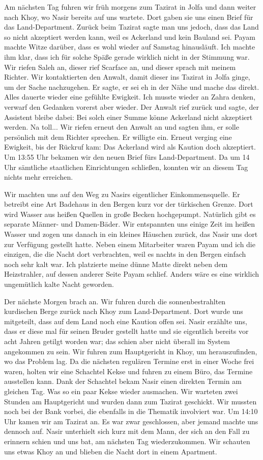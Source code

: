 Am nächsten Tag fuhren wir früh morgens zum Tazirat in Jolfa und dann weiter nach Khoy, wo Nasir bereits auf uns wartete. Dort gaben sie uns einen Brief für das Land-Department. Zurück beim Tazirat sagte man uns jedoch, dass das Land so nicht akzeptiert werden kann, weil es Ackerland und kein Bauland sei. Payam machte Witze darüber, dass es wohl wieder auf Samstag hinausläuft. Ich machte ihm klar, dass ich für solche Späße gerade wirklich nicht in der Stimmung war. Wir riefen Saleh an, dieser rief Scarface an, und dieser sprach mit meinem Richter. Wir kontaktierten den Anwalt, damit dieser ins Tazirat in Jolfa ginge, um der Sache nachzugehen. Er sagte, er sei eh in der Nähe und mache das direkt. Alles dauerte wieder eine gefühlte Ewigkeit. Ich musste wieder an Zahra denken, verwarf den Gedanken vorerst aber wieder. Der Anwalt rief zurück und sagte, der Assistent bleibe dabei: Bei solch einer Summe könne Ackerland nicht akzeptiert werden. Na toll... Wir riefen erneut den Anwalt an und sagten ihm, er solle persönlich mit dem Richter sprechen. Er willigte ein. Erneut verging eine Ewigkeit, bis der Rückruf kam: Das Ackerland wird als Kaution doch akzeptiert. Um 13:55 Uhr bekamen wir den neuen Brief fürs Land-Department. Da um 14 Uhr sämtliche staatlichen Einrichtungen schließen, konnten wir an diesem Tag nichts mehr erreichen.

Wir machten uns auf den Weg zu Nasirs eigentlicher Einkommensquelle. Er betreibt eine Art Badehaus in den Bergen kurz vor der türkischen Grenze. Dort wird Wasser aus heißen Quellen in große Becken hochgepumpt. Natürlich gibt es separate Männer- und Damen-Bäder. Wir entspannten uns einige Zeit im heißen Wasser und zogen uns danach in ein kleines Häuschen zurück, das Nasir uns dort zur Verfügung gestellt hatte. Neben einem Mitarbeiter waren Payam und ich die einzigen, die die Nacht dort verbrachten, weil es nachts in den Bergen einfach noch sehr kalt war. Ich platzierte meine dünne Matte direkt neben dem Heizstrahler, auf dessen anderer Seite Payam schlief. Anders wäre es eine wirklich ungemütlich kalte Nacht geworden.

Der nächste Morgen brach an. Wir fuhren durch die sonnenbestrahlten kurdischen Berge zurück nach Khoy zum Land-Department. Dort wurde uns mitgeteilt, dass auf dem Land noch eine Kaution offen sei. Nasir erzählte uns, dass er diese mal für seinen Bruder gestellt hatte und sie eigentlich bereits vor acht Jahren getilgt worden war; das schien aber nicht überall im System angekommen zu sein. Wir fuhren zum Hauptgericht in Khoy, um herauszufinden, wo das Problem lag. Da die nächsten regulären Termine erst in einer Woche frei waren, holten wir eine Schachtel Kekse und fuhren zu einem Büro, das Termine ausstellen kann. Dank der Schachtel bekam Nasir einen direkten Termin am gleichen Tag. Was so ein paar Kekse wieder ausmachen. Wir warteten zwei Stunden am Hauptgericht und wurden dann zum Tazirat geschickt. Wir mussten noch bei der Bank vorbei, die ebenfalls in die Thematik involviert war. Um 14:10 Uhr kamen wir am Tazirat an. Es war zwar geschlossen, aber jemand machte uns dennoch auf. Nasir unterhielt sich kurz mit dem Mann, der sich an den Fall zu erinnern schien und uns bat, am nächsten Tag wiederzukommen. Wir schauten uns etwas Khoy an und blieben die Nacht dort in einem Apartment.

